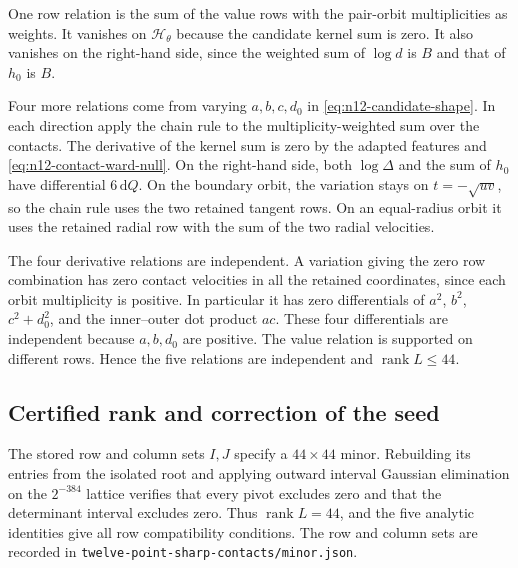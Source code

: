 \documentclass[11pt,letterpaper]{article}
\theoremstyle{remark}
\begin{document}
One row relation is the sum of the value rows with the pair-orbit multiplicities as weights. It vanishes on $\mathcal H_\theta$ because the candidate kernel sum is zero. It also vanishes on the right-hand side, since the weighted sum of $\log d$ is $B$ and that of $h_0$ is $B$.

Four more relations come from varying $a,b,c,d_0$ in \eqref{eq:n12-candidate-shape}. In each direction apply the chain rule to the multiplicity-weighted sum over the contacts. The derivative of the kernel sum is zero by the adapted features and \eqref{eq:n12-contact-ward-null}. On the right-hand side, both $\log\Delta$ and the sum of $h_0$ have differential $6\,\mathrm dQ$. On the boundary orbit, the variation stays on $t=-\sqrt{uv}$, so the chain rule uses the two retained tangent rows. On an equal-radius orbit it uses the retained radial row with the sum of the two radial velocities.

The four derivative relations are independent. A variation giving the zero row combination has zero contact velocities in all the retained coordinates, since each orbit multiplicity is positive. In particular it has zero differentials of $a^2$, $b^2$, $c^2+d_0^2$, and the inner--outer dot product $ac$. These four differentials are independent because $a,b,d_0$ are positive. The value relation is supported on different rows. Hence the five relations are independent and $\operatorname{rank} L\le44$.

\subsection{Certified rank and correction of the seed}

The stored row and column sets $I,J$ specify a $44\times44$ minor. Rebuilding its entries from the isolated root and applying outward interval Gaussian elimination on the $2^{-384}$ lattice verifies that every pivot excludes zero and that the determinant interval excludes zero. Thus $\operatorname{rank}L=44$, and the five analytic identities give all row compatibility conditions. The row and column sets are recorded in \texttt{twelve-point-sharp-contacts/}\allowbreak\texttt{minor.json}.
\end{document}
